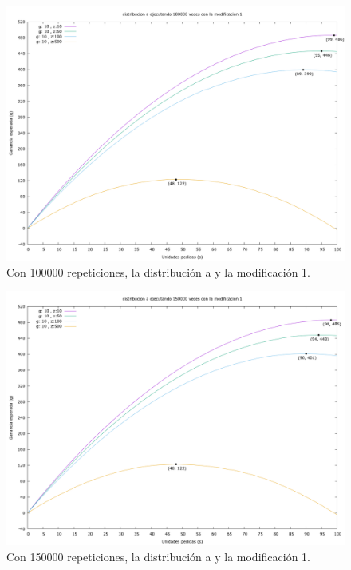 \documentclass[12pt, spanish]{article}
\begin{document}
\begin{figure}[H]
	\centering
	\includegraphics[scale = 0.2]{prob_a/datos_a_100000_1.png}
	\caption{Con 100000 repeticiones, la distribución a y la modificación 1.}
	\label{fig:ej1_a_100000}

\end{figure}

\begin{figure}[H]
	\centering
	\includegraphics[scale = 0.2]{prob_a/datos_a_150000_1.png}
	\caption{Con 150000 repeticiones, la distribución a y la modificación 1.}
	\label{fig:ej1_a_150000}

\end{figure}
\end{document}

